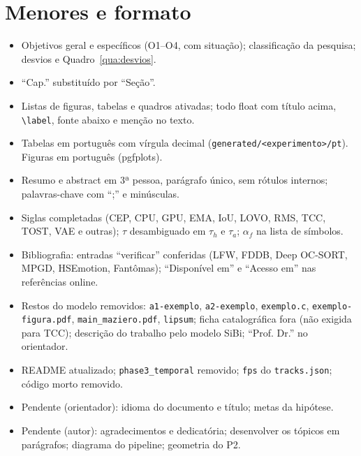 \section{Menores e formato}
\begin{itemize}
\item Objetivos geral e específicos (O1--O4, com situação); classificação da pesquisa; desvios e Quadro~\ref{qua:desvios}.
\item ``Cap.'' substituído por ``Seção''.
\item Listas de figuras, tabelas e quadros ativadas; todo float com título acima, \texttt{\textbackslash label}, fonte abaixo e menção no texto.
\item Tabelas em português com vírgula decimal (\texttt{generated/<experimento>/pt}). Figuras em português (pgfplots).
\item Resumo e abstract em 3ª pessoa, parágrafo único, sem rótulos internos; palavras-chave com ``;'' e minúsculas.
\item Siglas completadas (CEP, CPU, GPU, EMA, IoU, LOVO, RMS, TCC, TOST, VAE e outras); $\tau$ desambiguado em $\tau_h$ e $\tau_a$; $\alpha_f$ na lista de símbolos.
\item Bibliografia: entradas ``verificar'' conferidas (LFW, FDDB, Deep OC-SORT, MPGD, HSEmotion, Fantômas); ``Disponível em'' e ``Acesso em'' nas referências online.
\item Restos do modelo removidos: \texttt{a1-exemplo}, \texttt{a2-exemplo}, \texttt{exemplo.c}, \texttt{exemplo-figura.pdf}, \texttt{main\_maziero.pdf}, \texttt{lipsum}; ficha catalográfica fora (não exigida para TCC); descrição do trabalho pelo modelo SiBi; ``Prof. Dr.'' no orientador.
\item README atualizado; \texttt{phase3\_temporal} removido; \texttt{fps} do \texttt{tracks.json}; código morto removido.
\item Pendente (orientador): idioma do documento e título; metas da hipótese.
\item Pendente (autor): agradecimentos e dedicatória; desenvolver os tópicos em parágrafos; diagrama do pipeline; geometria do P2.
\end{itemize}

